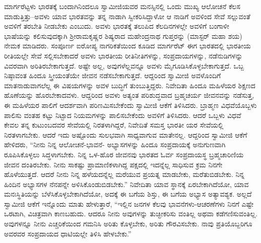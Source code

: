ಮಾರ್ಗರೆಟ್ಟಳು ಭಾರತಕ್ಕೆ ಬಂದಾಗಿನಿಂದಲೂ ಸ್ವಾಮೀಜಿಯವರ ಮನಸ್ಸಿನಲ್ಲಿ ಒಂದು ಮುಖ್ಯ ಆಲೋಚನೆ ಕೆಲಸ ಮಾಡುತ್ತಿತ್ತು–ಅವಳು ಯಾವ ಭಾರತವನ್ನು ತನ್ನ ನಾಡಾಗಿ ಸ್ವೀಕರಿಸಿದ್ದಾಳೋ ಆ ನಾಡಿಗೆ ಅವಳಿಂದ ಸೇವೆ ಸಲ್ಲುವಂತೆ ಅವಳಿಗೆ ತರಬೇತಿ ನೀಡಬೇಕು ಎಂಬುದು. ಅವಳು ಭಾರತಕ್ಕೆ ತಲುಪಿದ ಕೆಲದಿನಗಳಲ್ಲೇ ಅವಳಿಗೆ ಬಂಗಾಳೀ ಭಾಷೆಯನ್ನು ಕಲಿಸುವುದಕ್ಕಾಗಿ ಶ್ರೀರಾಮಕೃಷ್ಣರ ಶಿಷ್ಯರಾದ ಮಹೇಂದ್ರನಾಥ ಗುಪ್ತರನ್ನು (ಮಾಸ್ಟರ್ ಮಹಾ ಶಯ) ನೇಮಕ ಮಾಡಿದರು. ಸಂಪೂರ್ಣ ಐರೋಪ್ಯ ನಾಗರಿಕತೆಯಿಂದ ಕೂಡಿದ ಮಾರ್ಗರೆಟ್ ಈಗ ಭಾರತದಲ್ಲಿ ಭಾರತೀಯ ರೀತಿಯಲ್ಲೇ ಸೇವೆ ಸಲ್ಲಿಸಬೇಕಾದರೆ ಅವಳು ಭಾರತೀಯ ರೀತಿನೀತಿಗಳನ್ನು, ಸಂಪ್ರದಾಯಗಳನ್ನು, ನಡೆನುಡಿಗಳನ್ನು ವಿವರವಾಗಿ ಅರಿತಿರಬೇಕಾಗುತ್ತದೆ. ಅಷ್ಟೇ ಅಲ್ಲ, ಅವುಗಳೆಲ್ಲವನ್ನೂ ಅವಳು ಮೈಗೂಡಿಸಿಕೊಳ್ಳಬೇಕಾಗುತ್ತದೆ. ಒಬ್ಬ ನಿಷ್ಠಾವಂತ ಹಿಂದೂ ಸ್ತ್ರೀಯಂತೆಯೇ ಜೀವನ ನಡೆಸಬೇಕಾಗುತ್ತದೆ. ಆದ್ದರಿಂದ ಸ್ವಾಮೀಜಿ ಅವಳೊಂದಿಗೆ ಮಾತನಾಡುವಾಗಲೆಲ್ಲ ಈ ವಿಷಯಗಳನ್ನು ಅವಳ ಬುದ್ಧಿಗೆ ತುಂಬುತ್ತಿದ್ದರು. ನಿವೇದಿತಾ ಹಿಂದೂ ಮಹಿಳೆಯರ ಶಿಕ್ಷಣದ ಹೊಣೆಯನ್ನು ಹೊರಬೇಕಾದವಳು. ಆದ್ದರಿಂದ ಅವಳು ಅತ್ಯಂತ ಪರಿಶುದ್ಧವಾದ ಬ್ರಹ್ಮಚರ್ಯ ಜೀವನವನ್ನು ನಡೆಸುತ್ತ, ಈ ಮಹಿಳೆಯರ ಪಾಲಿಗೆ ಆದರ್ಶವಾಗಿ ಪರಿಣಮಿಸಬೇಕೆಂದು ಸ್ವಾಮೀಜಿ ಆಕೆಗೆ ತಿಳಿಸಿದರು. ಬ್ರಾಹ್ಮಣ ವಿಧವೆಯೊಬ್ಬಳು ಪಾಲಿಸು ವಂತಹ ಕಟ್ಟು ನಿಟ್ಟಾದ ನಿಯಮಗಳನ್ನು ಪಾಲಿಸಬೇಕೆಂದು ಅವಳಿಗೆ ತಿಳಿಸಿದರು. ಆದರೆ ಒಬ್ಬಳು ವಿಧವೆ ಕೇವಲ ತನ್ನ ಕುಟುಂಬದವರ ಸೇವೆಯಲ್ಲಿ ನಿರತಳಾಗಿದ್ದರೆ, ನಿವೇದಿತೆ ಸಮಸ್ತ ಭಾರತೀ ಯರ ಸೇವೆಯಲ್ಲಿ ನಿರತಳಾಗಬೇಕು. ಆದರೆ ಇದು ಅಷ್ಟೊಂದು ಸುಲಭವಾಗಿ ಸಾಧ್ಯವಾಗುವ ಮಾತೇನಲ್ಲ. ಆದ್ದರಿಂದ ಸ್ವಾಮೀಜಿ ಆಕೆಗೆ ಹೇಳಿದರು, “ನೀನು ನಿನ್ನ ಆಲೋಚನೆ-ಭಾವನೆ- ಅಭ್ಯಾಸಗಳನ್ನು ಹಿಂದೂ ಸಂಪ್ರದಾಯಕ್ಕೆ ಅನುಗುಣವಾಗಿ ರೂಪಿಸಿಕೊಳ್ಳಲು ಸಿದ್ಧಳಾಗಬೇಕು. ನಿನ್ನ ಒಳ-ಹೊರ ಜೀವನವು ಭಾರತದ ಓರ್ವ ಸಂಪ್ರದಾಯಸ್ಥ ಬ್ರಹ್ಮಚಾರಿಣಿಯ ಜೀವನ ದಂತಿರಬೇಕು. ನೀನು ಸಾಕಷ್ಟು ಪ್ರಾಮಾಣಿಕಳಾಗಿದ್ದ ಪಕ್ಷದಲ್ಲಿ ಇದನ್ನೆಲ್ಲ ಸಾಧಿಸುವ ಕ್ರಮ ನಿನಗೇ ಹೊಳೆಯುತ್ತದೆ. ಆದರೆ ನೀನು ನಿನ್ನ ಹಳೆಯದನ್ನೆಲ್ಲ ಮರೆಯುವ ಪ್ರಯತ್ನ ಮಾಡಬೇಕು, ಮರೆತುಬಿಡಬೇಕು. ನಿನ್ನ ಹಿಂದಿನ ಅಭ್ಯಾಸಗಳ ನೆನಪನ್ನೇ ಅಳಿಸಿಕೊಂಡುಬಿಡಬೇಕು.” ನಿವೇದಿತಾ ಯಾವ ಸ್ಥಾನಕ್ಕೆ ಏರಬೇಕಾಗಿದೆಯೋ, ಯಾವ ಮನಃಸ್ಥಿತಿಯನ್ನು ಬೆಳೆಸಿಕೊಳ್ಳಬೇಕಾಗಿದೆಯೋ, ಅದಕ್ಕೆ ಈ ಬಗೆಯ ಶಿಸ್ತು, ಈ ಬಗೆಯ ಅಭ್ಯಾಸ ಅತ್ಯಾವಶ್ಯಕ. ಅಲ್ಲದೆ ಸ್ವಾಮೀಜಿ ಆಕೆಗೆ ಇನ್ನೊಂದು ಮಾತು ಹೇಳುತ್ತಾರೆ, “ಇಲ್ಲಿನ ಜನಗಳ ಕೆಲವು ಭಾವನೆಗಳು-ಆಚರಣೆಗಳು ನಿನಗೆ ಎಷ್ಟೇ ಒರಟಾಗಿ, ವಿಚಿತ್ರವಾಗಿ ಕಾಣಬಹುದು. ಆದರೂ ನೀನು ಅವುಗಳನ್ನು ತುಚ್ಛೀಕರಿಸು ವಂತಿಲ್ಲ ಅಥವಾ ಕಡೆಗಣಿಸುವಂತಿಲ್ಲ. ಅವುಗಳನ್ನೂ ನೀನು ಎಚ್ಚರಿಕೆಯಿಂದ ಗಮನಿಸಿ ಅರಿತು ಕೊಳ್ಳಬೇಕು, ಅರಿತು ಗೌರವಿಸಬೇಕು. ನಾವು ಪ್ರತಿಯೊಬ್ಬರಿಗೂ ಅವರವರ ಸಂಪ್ರದಾಯದ ಧಾಟಿಯಲ್ಲೇ ತಿಳಿಸಿ ಹೇಳಬೇಕು.”

